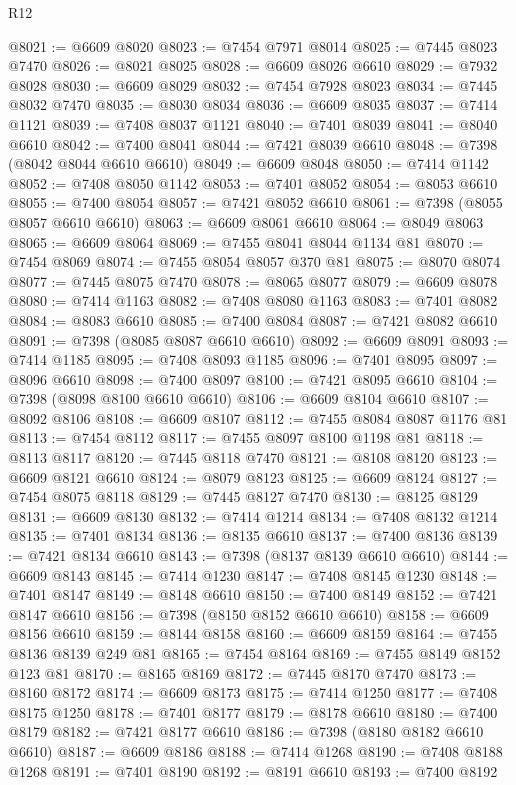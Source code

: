 \begin{lexlean}{R12}
\begin{coremodule}
{{{{{{{{{{{{{{{{{{{{{{{{{{{{{{{{{{{{{{{{{{{{{{{{{{{{{{{{{{{{{{{{{{{{{{{{{{{{{{{{{{@8021 := @6609 @8020
@8023 := @7454 @7971 @8014
@8025 := @7445 @8023 @7470
@8026 := @8021 @8025
@8028 := @6609 @8026 @6610
@8029 := @7932 @8028
@8030 := @6609 @8029
@8032 := @7454 @7928 @8023
@8034 := @7445 @8032 @7470
@8035 := @8030 @8034
@8036 := @6609 @8035
@8037 := @7414 @1121
@8039 := @7408 @8037 @1121
@8040 := @7401 @8039
@8041 := @8040 @6610
@8042 := @7400 @8041
@8044 := @7421 @8039 @6610
@8048 := @7398 (@8042 @8044 @6610 @6610)
@8049 := @6609 @8048
@8050 := @7414 @1142
@8052 := @7408 @8050 @1142
@8053 := @7401 @8052
@8054 := @8053 @6610
@8055 := @7400 @8054
@8057 := @7421 @8052 @6610
@8061 := @7398 (@8055 @8057 @6610 @6610)
@8063 := @6609 @8061 @6610
@8064 := @8049 @8063
@8065 := @6609 @8064
@8069 := @7455 @8041 @8044 @1134 @81
@8070 := @7454 @8069
@8074 := @7455 @8054 @8057 @370 @81
@8075 := @8070 @8074
@8077 := @7445 @8075 @7470
@8078 := @8065 @8077
@8079 := @6609 @8078
@8080 := @7414 @1163
@8082 := @7408 @8080 @1163
@8083 := @7401 @8082
@8084 := @8083 @6610
@8085 := @7400 @8084
@8087 := @7421 @8082 @6610
@8091 := @7398 (@8085 @8087 @6610 @6610)
@8092 := @6609 @8091
@8093 := @7414 @1185
@8095 := @7408 @8093 @1185
@8096 := @7401 @8095
@8097 := @8096 @6610
@8098 := @7400 @8097
@8100 := @7421 @8095 @6610
@8104 := @7398 (@8098 @8100 @6610 @6610)
@8106 := @6609 @8104 @6610
@8107 := @8092 @8106
@8108 := @6609 @8107
@8112 := @7455 @8084 @8087 @1176 @81
@8113 := @7454 @8112
@8117 := @7455 @8097 @8100 @1198 @81
@8118 := @8113 @8117
@8120 := @7445 @8118 @7470
@8121 := @8108 @8120
@8123 := @6609 @8121 @6610
@8124 := @8079 @8123
@8125 := @6609 @8124
@8127 := @7454 @8075 @8118
@8129 := @7445 @8127 @7470
@8130 := @8125 @8129
@8131 := @6609 @8130
@8132 := @7414 @1214
@8134 := @7408 @8132 @1214
@8135 := @7401 @8134
@8136 := @8135 @6610
@8137 := @7400 @8136
@8139 := @7421 @8134 @6610
@8143 := @7398 (@8137 @8139 @6610 @6610)
@8144 := @6609 @8143
@8145 := @7414 @1230
@8147 := @7408 @8145 @1230
@8148 := @7401 @8147
@8149 := @8148 @6610
@8150 := @7400 @8149
@8152 := @7421 @8147 @6610
@8156 := @7398 (@8150 @8152 @6610 @6610)
@8158 := @6609 @8156 @6610
@8159 := @8144 @8158
@8160 := @6609 @8159
@8164 := @7455 @8136 @8139 @249 @81
@8165 := @7454 @8164
@8169 := @7455 @8149 @8152 @123 @81
@8170 := @8165 @8169
@8172 := @7445 @8170 @7470
@8173 := @8160 @8172
@8174 := @6609 @8173
@8175 := @7414 @1250
@8177 := @7408 @8175 @1250
@8178 := @7401 @8177
@8179 := @8178 @6610
@8180 := @7400 @8179
@8182 := @7421 @8177 @6610
@8186 := @7398 (@8180 @8182 @6610 @6610)
@8187 := @6609 @8186
@8188 := @7414 @1268
@8190 := @7408 @8188 @1268
@8191 := @7401 @8190
@8192 := @8191 @6610
@8193 := @7400 @8192
}}}}}}}}}}}}}}}}}}}}}}}}}}}}}}}}}}}}}}}}}}}}}}}}}}}}}}}}}}}}}}}}}}}}}}}}}}}}}}}}}}
\end{coremodule}
\end{lexlean}
